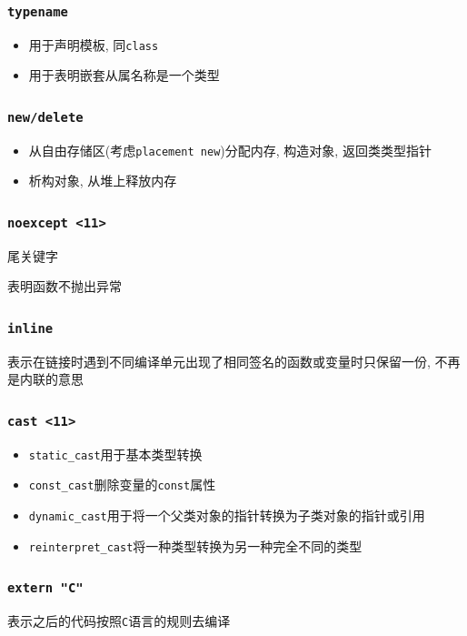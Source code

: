 \subsubsection{\tt typename}
\begin{itemize}
	\item 用于声明模板, 同{\tt class}
	\item 用于表明嵌套从属名称是一个类型
\end{itemize}
\subsubsection{\tt new/delete}

\begin{itemize}
	\item 从自由存储区(考虑{\tt placement new})分配内存, 构造对象, 返回类类型指针
	\item 析构对象, 从堆上释放内存
\end{itemize}

\subsubsection{\tt noexcept <11>}
尾关键字

表明函数不抛出异常
\subsubsection{\tt inline}
表示在链接时遇到不同编译单元出现了相同签名的函数或变量时只保留一份, 不再是内联的意思
\subsubsection{\tt cast <11>}
\begin{itemize}
	\item {\tt static\_cast}用于基本类型转换
	\item {\tt const\_cast}删除变量的{\tt const}属性
	\item {\tt dynamic\_cast}用于将一个父类对象的指针转换为子类对象的指针或引用
	\item {\tt reinterpret\_cast}将一种类型转换为另一种完全不同的类型
\end{itemize}

\subsubsection{\tt extern "C"}
表示之后的代码按照{\tt C}语言的规则去编译

